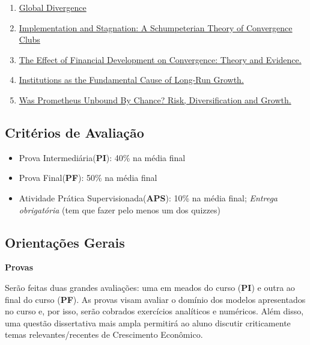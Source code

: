\documentclass[a4paper,12pt]{article}[abntex2]
\begin{document}
\begin{enumerate}
    \item \href{https://papers.ssrn.com/sol3/Delivery.cfm/SSRN_ID335140_code021023500.pdf?abstractid=335140&mirid=1}{Global Divergence} 
    \item \href{https://pt.z-lib.gs/book/50968277/a7323e/rd-implementation-and-stagnation-a-schumpeterian-theory-of-convergence-clubs.html}{Implementation and Stagnation: A Schumpeterian Theory of Convergence Clubs} 
    \item \href{https://pt.z-lib.gs/book/58885018/52d3dc/the-effect-of-financial-development-on-convergence-theory-and-evidence.html}{The Effect of Financial Development on Convergence: Theory and Evidence.} 
    \item \href{https://pt.z-lib.gs/book/55048434/9b868f/handbook-of-economic-growth-volume-1-chapter-6-institutions-as-a-fundamental-cause-of-longrunidadehtml}{Institutions as the Fundamental Cause of Long-Run Growth.}
    \item \href{https://pt.z-lib.gs/book/47902129/5f0fe9/was-prometheus-unbound-by-chance-risk-diversification-and-growth.html}{Was Prometheus Unbound By Chance? Risk, Diversification and Growth.} 
\end{enumerate}

\subsection*{\textbf{Critérios de Avaliação}}
\begin{itemize}
    \item Prova Intermediária(\textbf{PI}): 40\% na média final
    \item Prova Final(\textbf{PF}): 50\% na média final
    \item Atividade Prática Supervisionada(\textbf{APS}): 10\% na média final; \textit{Entrega obrigatória} (tem que fazer pelo menos um dos quizzes)
\end{itemize}

\subsection*{\textbf{Orientações Gerais}}

\textbf{Provas}

Serão feitas duas grandes avaliações: uma em meados do curso (\textbf{PI}) e outra ao final do curso (\textbf{PF}). As provas visam avaliar o domínio dos modelos apresentados no curso e, por isso, serão cobrados exercícios analíticos e numéricos. Além disso, uma questão dissertativa mais ampla permitirá ao aluno discutir criticamente temas relevantes/recentes de Crescimento Econômico.
\end{document}
